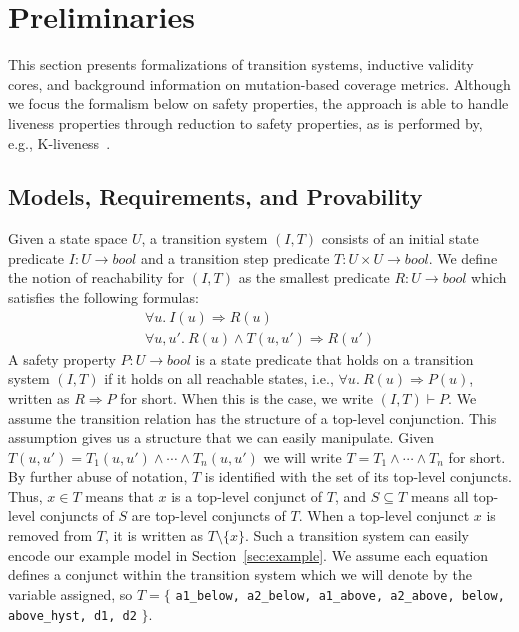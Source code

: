 \section{Preliminaries}
\label{sec:background}
\newcommand{\satisfies}{\vdash_{\!\!s}}
\newcommand{\nsatisfies}{\nvdash_{\!\!s}}
\newcommand{\bool}[0]{\mathit{bool}}
\newcommand{\reach}[0]{\mathit{R}}
\newcommand{\ite}[3]{\mathit{if}\ {#1}\ \mathit{then}\ {#2}\ \mathit{else}\ {#3}}
\newcommand{\ivc}{\textit{IVC}}
\newcommand{\mivc}{\textit{MIVC}}
This section presents formalizations of transition systems, inductive validity cores, and background information on mutation-based coverage metrics.  Although we focus the formalism below on safety properties, the approach is able to handle liveness properties through reduction to safety properties, as is performed by, e.g., K-liveness~\cite{conf/fmcad/ClaessenS12}.

\subsection{Models, Requirements, and Provability}

Given a state space $U$, a transition system $(I,T)$ consists of an
initial state predicate $I : U \to \bool$ and a transition step
predicate $T : U \times U \to \bool$. We define the notion of
reachability for $(I, T)$ as the smallest predicate $\reach : U \to
\bool$ which satisfies the following formulas:
\begin{gather*}
  \forall u.~ I(u) \Rightarrow \reach(u) \\
  \forall u, u'.~ \reach(u) \land T(u, u') \Rightarrow \reach(u')
\end{gather*}
A safety property $P : U \to \bool$ is a state predicate that holds on a transition system $(I, T)$ if it holds on all
reachable states, i.e., $\forall u.~ \reach(u) \Rightarrow P(u)$,
written as $\reach \Rightarrow P$ for short. When this is the case, we
write $(I, T)\vdash P$. We assume the transition relation has the structure of a top-level conjunction. This assumption gives us a structure that we can easily manipulate. Given $T(u, u') = T_1(u, u') \land \cdots \land T_n(u, u')$ we will write $T = T_1 \land \cdots \land T_n$ for short.
By further abuse of notation,
$T$ is identified with the set of its top-level conjuncts. Thus, $x \in
T$ means that $x$ is a top-level conjunct of $T$, and $S
\subseteq T$ means all top-level conjuncts of $S$ are top-level
conjuncts of $T$. When a top-level conjunct $x$ is removed from $T$, it is written as $T \setminus \{x\}$. Such a transition system can easily encode our example model in Section~\ref{sec:example}.  We assume each equation defines a conjunct within the transition system which we will denote by the variable assigned, so $T = \{$ {\small \texttt{a1\_below, a2\_below, a1\_above, a2\_above, below, above\_hyst, d1, d2}} $\}$.



